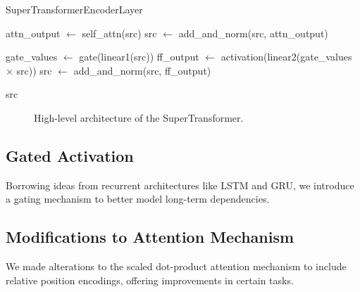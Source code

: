 \documentclass{article}
\begin{document}
\begin{algorithm}
\caption{SuperTransformerEncoderLayer}
\begin{algorithmic}[1]
    \State attn\_output $\leftarrow$ self\_attn(src)
    \State src $\leftarrow$ add\_and\_norm(src, attn\_output)
    
    \State gate\_values $\leftarrow$ gate(linear1(src))
    \State ff\_output $\leftarrow$ activation(linear2(gate\_values $\times$ src))
    \State src $\leftarrow$ add\_and\_norm(src, ff\_output)
    
    \Return src
\EndProcedure
\end{algorithmic}
\end{algorithm}

\begin{figure}[h]
\centering
{}
\caption{High-level architecture of the SuperTransformer.}
\label{fig:supertransformer_arch}
\end{figure}

\subsection{Gated Activation}
Borrowing ideas from recurrent architectures like LSTM and GRU, we introduce a gating mechanism to better model long-term dependencies.

\subsection{Modifications to Attention Mechanism}
We made alterations to the scaled dot-product attention mechanism to include relative position encodings, offering improvements in certain tasks.
\end{document}
